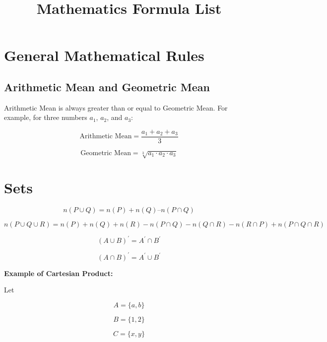 \documentclass{article}
\title{Mathematics Formula List}
\author{}
\date{}
\begin{document}
\maketitle

\section{General Mathematical Rules}

\subsection{Arithmetic Mean and Geometric Mean}

Arithmetic Mean is always greater than or equal to Geometric Mean. For example, for three numbers \(a_1\), \(a_2\), and \(a_3\):

\begin{equation}
\text{Arithmetic Mean} = \frac{a_1 + a_2 + a_3}{3}
\end{equation}

\begin{equation}
\text{Geometric Mean} = \sqrt[3]{a_1 \cdot a_2 \cdot a_3}
\end{equation}

\section{Sets}

\begin{equation}
n(P \cup Q) = n(P) + n(Q) – n(P \cap Q)
\end{equation}

\begin{equation}
n(P \cup Q \cup R) = n(P) + n(Q) + n(R) - n(P \cap Q) - n(Q \cap R) - n(R \cap P) + n(P \cap Q \cap R)
\end{equation}

\begin{equation}
(A \cup B)^{'} = A^{'} \cap B^{'}
\end{equation}

\begin{equation}
(A \cap B)^{'} = A^{'} \cup B^{'}
\end{equation}

\textbf{Example of Cartesian Product:}

Let

\[
A = \{a, b\}
\]

\[
B = \{1, 2\}
\]

\[
C = \{x, y\}
\]
\end{document}
